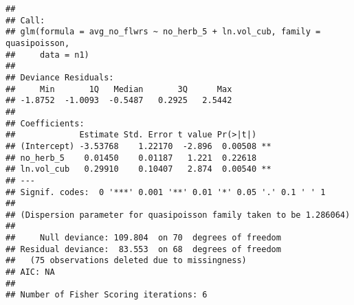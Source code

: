 \documentclass[]{article}
\newenvironment{Shaded}{\begin{snugshade}}{\end{snugshade}}
\newcommand{\KeywordTok}[1]{\textcolor[rgb]{0.13,0.29,0.53}{\textbf{#1}}}
\newcommand{\DataTypeTok}[1]{\textcolor[rgb]{0.13,0.29,0.53}{#1}}
\newcommand{\DecValTok}[1]{\textcolor[rgb]{0.00,0.00,0.81}{#1}}
\newcommand{\FloatTok}[1]{\textcolor[rgb]{0.00,0.00,0.81}{#1}}
\newcommand{\StringTok}[1]{\textcolor[rgb]{0.31,0.60,0.02}{#1}}
\newcommand{\OperatorTok}[1]{\textcolor[rgb]{0.81,0.36,0.00}{\textbf{#1}}}
\newcommand{\NormalTok}[1]{#1}
\begin{document}
\begin{verbatim}
## 
## Call:
## glm(formula = avg_no_flwrs ~ no_herb_5 + ln.vol_cub, family = quasipoisson, 
##     data = n1)
## 
## Deviance Residuals: 
##     Min       1Q   Median       3Q      Max  
## -1.8752  -1.0093  -0.5487   0.2925   2.5442  
## 
## Coefficients:
##             Estimate Std. Error t value Pr(>|t|)   
## (Intercept) -3.53768    1.22170  -2.896  0.00508 **
## no_herb_5    0.01450    0.01187   1.221  0.22618   
## ln.vol_cub   0.29910    0.10407   2.874  0.00540 **
## ---
## Signif. codes:  0 '***' 0.001 '**' 0.01 '*' 0.05 '.' 0.1 ' ' 1
## 
## (Dispersion parameter for quasipoisson family taken to be 1.286064)
## 
##     Null deviance: 109.804  on 70  degrees of freedom
## Residual deviance:  83.553  on 68  degrees of freedom
##   (75 observations deleted due to missingness)
## AIC: NA
## 
## Number of Fisher Scoring iterations: 6
\end{verbatim}

\begin{Shaded}
\end{Shaded}
\end{document}
